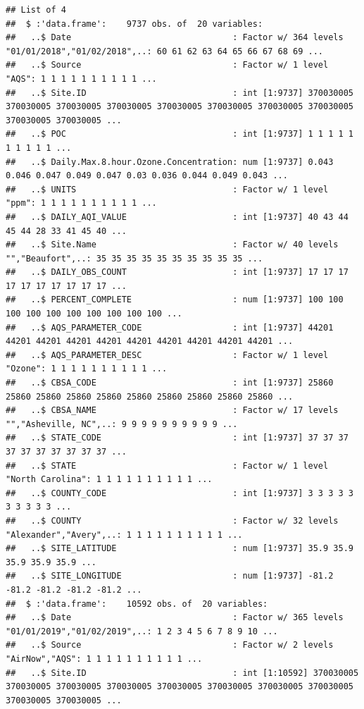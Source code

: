 \documentclass[
]{article}
\begin{document}
\begin{verbatim}
## List of 4
##  $ :'data.frame':    9737 obs. of  20 variables:
##   ..$ Date                                : Factor w/ 364 levels "01/01/2018","01/02/2018",..: 60 61 62 63 64 65 66 67 68 69 ...
##   ..$ Source                              : Factor w/ 1 level "AQS": 1 1 1 1 1 1 1 1 1 1 ...
##   ..$ Site.ID                             : int [1:9737] 370030005 370030005 370030005 370030005 370030005 370030005 370030005 370030005 370030005 370030005 ...
##   ..$ POC                                 : int [1:9737] 1 1 1 1 1 1 1 1 1 1 ...
##   ..$ Daily.Max.8.hour.Ozone.Concentration: num [1:9737] 0.043 0.046 0.047 0.049 0.047 0.03 0.036 0.044 0.049 0.043 ...
##   ..$ UNITS                               : Factor w/ 1 level "ppm": 1 1 1 1 1 1 1 1 1 1 ...
##   ..$ DAILY_AQI_VALUE                     : int [1:9737] 40 43 44 45 44 28 33 41 45 40 ...
##   ..$ Site.Name                           : Factor w/ 40 levels "","Beaufort",..: 35 35 35 35 35 35 35 35 35 35 ...
##   ..$ DAILY_OBS_COUNT                     : int [1:9737] 17 17 17 17 17 17 17 17 17 17 ...
##   ..$ PERCENT_COMPLETE                    : num [1:9737] 100 100 100 100 100 100 100 100 100 100 ...
##   ..$ AQS_PARAMETER_CODE                  : int [1:9737] 44201 44201 44201 44201 44201 44201 44201 44201 44201 44201 ...
##   ..$ AQS_PARAMETER_DESC                  : Factor w/ 1 level "Ozone": 1 1 1 1 1 1 1 1 1 1 ...
##   ..$ CBSA_CODE                           : int [1:9737] 25860 25860 25860 25860 25860 25860 25860 25860 25860 25860 ...
##   ..$ CBSA_NAME                           : Factor w/ 17 levels "","Asheville, NC",..: 9 9 9 9 9 9 9 9 9 9 ...
##   ..$ STATE_CODE                          : int [1:9737] 37 37 37 37 37 37 37 37 37 37 ...
##   ..$ STATE                               : Factor w/ 1 level "North Carolina": 1 1 1 1 1 1 1 1 1 1 ...
##   ..$ COUNTY_CODE                         : int [1:9737] 3 3 3 3 3 3 3 3 3 3 ...
##   ..$ COUNTY                              : Factor w/ 32 levels "Alexander","Avery",..: 1 1 1 1 1 1 1 1 1 1 ...
##   ..$ SITE_LATITUDE                       : num [1:9737] 35.9 35.9 35.9 35.9 35.9 ...
##   ..$ SITE_LONGITUDE                      : num [1:9737] -81.2 -81.2 -81.2 -81.2 -81.2 ...
##  $ :'data.frame':    10592 obs. of  20 variables:
##   ..$ Date                                : Factor w/ 365 levels "01/01/2019","01/02/2019",..: 1 2 3 4 5 6 7 8 9 10 ...
##   ..$ Source                              : Factor w/ 2 levels "AirNow","AQS": 1 1 1 1 1 1 1 1 1 1 ...
##   ..$ Site.ID                             : int [1:10592] 370030005 370030005 370030005 370030005 370030005 370030005 370030005 370030005 370030005 370030005 ...

\end{verbatim}
\end{document}
